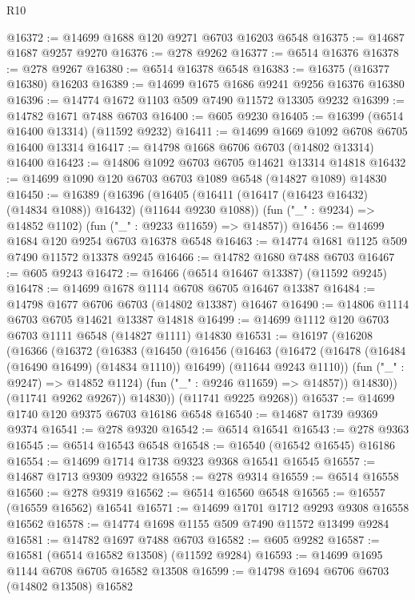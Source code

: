 \begin{lexlean}{R10}
\begin{coremodule}
@16372 := @14699 @1688 @120 @9271 @6703 @16203 @6548
@16375 := @14687 @1687 @9257 @9270
@16376 := @278 @9262
@16377 := @6514 @16376
@16378 := @278 @9267
@16380 := @6514 @16378 @6548
@16383 := @16375 (@16377 @16380) @16203
@16389 := @14699 @1675 @1686 @9241 @9256 @16376 @16380
@16396 := @14774 @1672 @1103 @509 @7490 @11572 @13305 @9232
@16399 := @14782 @1671 @7488 @6703
@16400 := @605 @9230
@16405 := @16399 (@6514 @16400 @13314) (@11592 @9232)
@16411 := @14699 @1669 @1092 @6708 @6705 @16400 @13314
@16417 := @14798 @1668 @6706 @6703 (@14802 @13314) @16400
@16423 := @14806 @1092 @6703 @6705 @14621 @13314 @14818
@16432 := @14699 @1090 @120 @6703 @6703 @1089 @6548 (@14827 @1089) @14830
@16450 := @16389
    (@16396
      (@16405 (@16411 (@16417 (@16423 @16432) (@14834 @1088)) @16432) (@11644 @9230 @1088))
      (fun ("_" : @9234) => @14852 @1102)
      (fun ("_" : @9233 @11659) => @14857))
@16456 := @14699 @1684 @120 @9254 @6703 @16378 @6548
@16463 := @14774 @1681 @1125 @509 @7490 @11572 @13378 @9245
@16466 := @14782 @1680 @7488 @6703
@16467 := @605 @9243
@16472 := @16466 (@6514 @16467 @13387) (@11592 @9245)
@16478 := @14699 @1678 @1114 @6708 @6705 @16467 @13387
@16484 := @14798 @1677 @6706 @6703 (@14802 @13387) @16467
@16490 := @14806 @1114 @6703 @6705 @14621 @13387 @14818
@16499 := @14699 @1112 @120 @6703 @6703 @1111 @6548 (@14827 @1111) @14830
@16531 := @16197
    (@16208
      (@16366
        (@16372
          (@16383
            (@16450
              (@16456
                (@16463
                  (@16472
                    (@16478 (@16484 (@16490 @16499) (@14834 @1110)) @16499)
                    (@11644 @9243 @1110))
                  (fun ("_" : @9247) => @14852 @1124)
                  (fun ("_" : @9246 @11659) => @14857))
                @14830))
            (@11741 @9262 @9267))
          @14830))
      (@11741 @9225 @9268))
@16537 := @14699 @1740 @120 @9375 @6703 @16186 @6548
@16540 := @14687 @1739 @9369 @9374
@16541 := @278 @9320
@16542 := @6514 @16541
@16543 := @278 @9363
@16545 := @6514 @16543 @6548
@16548 := @16540 (@16542 @16545) @16186
@16554 := @14699 @1714 @1738 @9323 @9368 @16541 @16545
@16557 := @14687 @1713 @9309 @9322
@16558 := @278 @9314
@16559 := @6514 @16558
@16560 := @278 @9319
@16562 := @6514 @16560 @6548
@16565 := @16557 (@16559 @16562) @16541
@16571 := @14699 @1701 @1712 @9293 @9308 @16558 @16562
@16578 := @14774 @1698 @1155 @509 @7490 @11572 @13499 @9284
@16581 := @14782 @1697 @7488 @6703
@16582 := @605 @9282
@16587 := @16581 (@6514 @16582 @13508) (@11592 @9284)
@16593 := @14699 @1695 @1144 @6708 @6705 @16582 @13508
@16599 := @14798 @1694 @6706 @6703 (@14802 @13508) @16582

\end{coremodule}
\end{lexlean}
